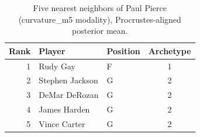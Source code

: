 \begin{table}[htbp]
  \centering\small
  \begin{tabular}{rllc}
    \toprule
    Rank & Player & Position & Archetype \\
    \midrule
    1 & Rudy Gay & F & 1 \\
    2 & Stephen Jackson & G & 2 \\
    3 & DeMar DeRozan & G & 2 \\
    4 & James Harden & G & 2 \\
    5 & Vince Carter & G & 2 \\
    \bottomrule
  \end{tabular}
  \caption{Five nearest neighbors of Paul Pierce (curvature_m5 modality), Procrustes-aligned posterior mean.}
  \label{tab:Paul_Pierce_neighbors_curvature_m5}
\end{table}

